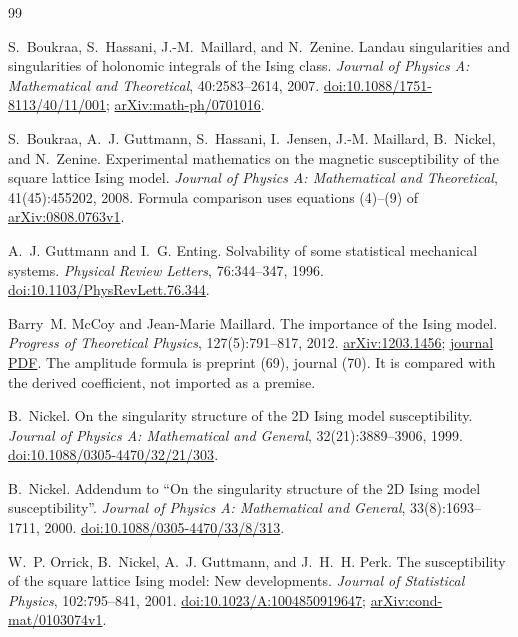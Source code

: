 \documentclass[11pt]{article}
\numberwithin{equation}{section}
\theoremstyle{definition}
\begin{document}
\begin{thebibliography}{99}

S.~Boukraa, S.~Hassani, J.-M.~Maillard, and N.~Zenine.
\newblock Landau singularities and singularities of holonomic integrals
of the Ising class.
\newblock \emph{Journal of Physics A: Mathematical and Theoretical},
40:2583--2614, 2007.
\newblock \href{https://doi.org/10.1088/1751-8113/40/11/001}{doi:10.1088/1751-8113/40/11/001};
\href{https://arxiv.org/abs/math-ph/0701016}{arXiv:math-ph/0701016}.

S.~Boukraa, A.~J. Guttmann, S.~Hassani, I.~Jensen, J.-M. Maillard,
B.~Nickel, and N.~Zenine.
\newblock Experimental mathematics on the magnetic susceptibility of the
square lattice {Ising} model.
\newblock \emph{Journal of Physics A: Mathematical and Theoretical},
41(45):455202, 2008.
\newblock Formula comparison uses equations (4)--(9) of
\href{https://arxiv.org/abs/0808.0763v1}{arXiv:0808.0763v1}.

A.~J. Guttmann and I.~G. Enting.
\newblock Solvability of some statistical mechanical systems.
\newblock \emph{Physical Review Letters}, 76:344--347, 1996.
\newblock \href{https://doi.org/10.1103/PhysRevLett.76.344}{doi:10.1103/PhysRevLett.76.344}.

Barry~M. McCoy and Jean-Marie Maillard.
\newblock The importance of the {Ising} model.
\newblock \emph{Progress of Theoretical Physics}, 127(5):791--817, 2012.
\newblock \href{https://arxiv.org/abs/1203.1456}{arXiv:1203.1456};
\href{https://www.lptmc.jussieu.fr/files/maillard/PUB2/The_Importance_Ising.pdf}{journal PDF}.
The amplitude formula is preprint (69), journal (70).
It is compared with the derived coefficient, not imported as a premise.

B.~Nickel.
\newblock On the singularity structure of the 2D {Ising} model susceptibility.
\newblock \emph{Journal of Physics A: Mathematical and General},
32(21):3889--3906, 1999.
\newblock \href{https://doi.org/10.1088/0305-4470/32/21/303}{doi:10.1088/0305-4470/32/21/303}.

B.~Nickel.
\newblock Addendum to ``On the singularity structure of the 2D {Ising}
model susceptibility''.
\newblock \emph{Journal of Physics A: Mathematical and General},
33(8):1693--1711, 2000.
\newblock \href{https://doi.org/10.1088/0305-4470/33/8/313}{doi:10.1088/0305-4470/33/8/313}.

W.~P. Orrick, B.~Nickel, A.~J. Guttmann, and J.~H.~H. Perk.
\newblock The susceptibility of the square lattice {Ising} model:
New developments.
\newblock \emph{Journal of Statistical Physics}, 102:795--841, 2001.
\newblock \href{https://doi.org/10.1023/A:1004850919647}{doi:10.1023/A:1004850919647};
\href{https://arxiv.org/abs/cond-mat/0103074v1}{arXiv:cond-mat/0103074v1}.


\end{thebibliography}
\end{document}
